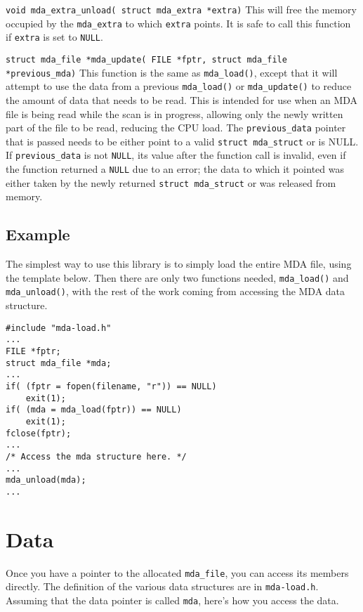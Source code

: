 \documentclass[10pt,letterpaper]{article}
\begin{document}
\vspace{1.5ex}
\noindent
\verb+void mda_extra_unload( struct mda_extra *extra)+ \linebreak
This will free the memory occupied by the \verb+mda_extra+ to which
\verb+extra+ points. It is safe to call this function if \verb+extra+
is set to \verb+NULL+.

\vspace{1.5ex}
\noindent
\verb+struct mda_file *mda_update( FILE *fptr, struct mda_file *previous_mda)+ \linebreak
This function is the same as \verb+mda_load()+, except that it will
attempt to use the data from a previous \verb+mda_load()+ or
\verb+mda_update()+ to reduce the amount of data that needs to be
read.  This is intended for use when an MDA file is being read while
the scan is in progress, allowing only the newly written part of the
file to be read, reducing the CPU load.  The \verb+previous_data+
pointer that is passed needs to be either point to a valid
\verb+struct mda_struct+ or is NULL.  If \verb+previous_data+ is not
\verb+NULL+, its value after the function call is invalid, even if the
function returned a \verb+NULL+ due to an error; the data to which it
pointed was either taken by the newly returned
\verb+struct mda_struct+ or was released from memory.

\subsection{Example}

The simplest way to use this library is to simply load the entire MDA
file, using the template below.  Then there are only two functions
needed, \verb+mda_load()+ and \verb+mda_unload()+, with the rest of
the work coming from accessing the MDA data structure.

\begin{verbatim}
#include "mda-load.h"
...
FILE *fptr;
struct mda_file *mda;
...
if( (fptr = fopen(filename, "r")) == NULL)
    exit(1);
if( (mda = mda_load(fptr)) == NULL)
    exit(1);
fclose(fptr);
...
/* Access the mda structure here. */
...
mda_unload(mda);
...
\end{verbatim}


\section{Data}

Once you have a pointer to the allocated \verb+mda_file+, you can
access its members directly.  The definition of the various data
structures are in \verb+mda-load.h+.  Assuming that the data pointer
is called \verb+mda+, here's how you access the data.
\end{document}
